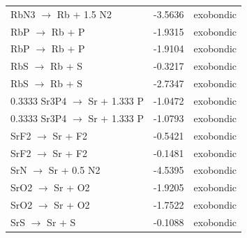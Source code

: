 \begin{longtable}{@{}lrl@{}}
RbN3 $\rightarrow$ Rb + 1.5 N2 & -3.5636 & exobondic \\
RbP $\rightarrow$ Rb + P & -1.9315 & exobondic \\
RbP $\rightarrow$ Rb + P & -1.9104 & exobondic \\
RbS $\rightarrow$ Rb + S & -0.3217 & exobondic \\
RbS $\rightarrow$ Rb + S & -2.7347 & exobondic \\
0.3333 Sr3P4 $\rightarrow$ Sr + 1.333 P & -1.0472 & exobondic \\
0.3333 Sr3P4 $\rightarrow$ Sr + 1.333 P & -1.0793 & exobondic \\
SrF2 $\rightarrow$ Sr + F2 & -0.5421 & exobondic \\
SrF2 $\rightarrow$ Sr + F2 & -0.1481 & exobondic \\
SrN $\rightarrow$ Sr + 0.5 N2 & -4.5395 & exobondic \\
SrO2 $\rightarrow$ Sr + O2 & -1.9205 & exobondic \\
SrO2 $\rightarrow$ Sr + O2 & -1.7522 & exobondic \\
SrS $\rightarrow$ Sr + S & -0.1088 & exobondic \\
\end{longtable}
